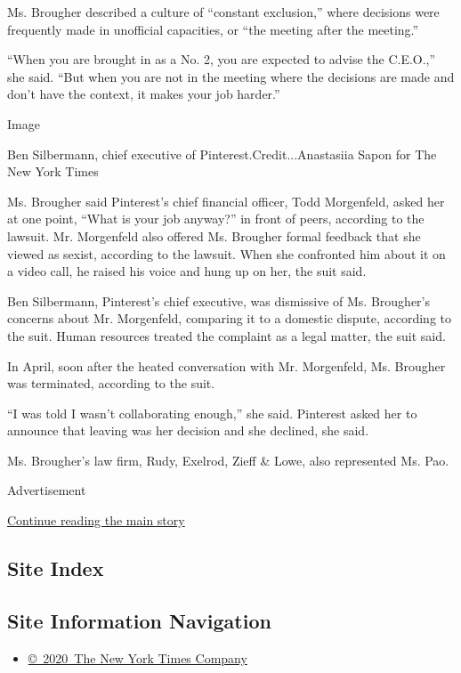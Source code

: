 Ms. Brougher described a culture of ``constant exclusion,'' where
decisions were frequently made in unofficial capacities, or ``the
meeting after the meeting.''

``When you are brought in as a No. 2, you are expected to advise the
C.E.O.,'' she said. ``But when you are not in the meeting where the
decisions are made and don't have the context, it makes your job
harder.''

Image

Ben Silbermann, chief executive of Pinterest.Credit...Anastasiia Sapon
for The New York Times

Ms. Brougher said Pinterest's chief financial officer, Todd Morgenfeld,
asked her at one point, ``What is your job anyway?'' in front of peers,
according to the lawsuit. Mr. Morgenfeld also offered Ms. Brougher
formal feedback that she viewed as sexist, according to the lawsuit.
When she confronted him about it on a video call, he raised his voice
and hung up on her, the suit said.

Ben Silbermann, Pinterest's chief executive, was dismissive of Ms.
Brougher's concerns about Mr. Morgenfeld, comparing it to a domestic
dispute, according to the suit. Human resources treated the complaint as
a legal matter, the suit said.

In April, soon after the heated conversation with Mr. Morgenfeld, Ms.
Brougher was terminated, according to the suit.

``I was told I wasn't collaborating enough,'' she said. Pinterest asked
her to announce that leaving was her decision and she declined, she
said.

Ms. Brougher's law firm, Rudy, Exelrod, Zieff \& Lowe, also represented
Ms. Pao.

Advertisement

\protect\hyperlink{after-bottom}{Continue reading the main story}

\hypertarget{site-index}{%
\subsection{Site Index}\label{site-index}}

\hypertarget{site-information-navigation}{%
\subsection{Site Information
Navigation}\label{site-information-navigation}}

\begin{itemize}
\tightlist
\item
  \href{https://help.nytimes3xbfgragh.onion/hc/en-us/articles/115014792127-Copyright-notice}{©~2020~The
  New York Times Company}
\end{itemize}

